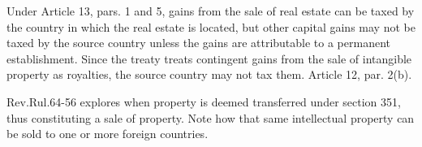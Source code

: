 Under Article 13, pars. 1 and 5, gains from the sale of real estate can be taxed by the country in which the real estate is located, but other capital gains may not be taxed by the source country unless the gains are attributable to a permanent establishment.  Since the treaty treats contingent gains from the sale of intangible property as royalties, the source country may not tax them.  Article 12, par. 2(b).      
    
Rev.\@\@ Rul.\@ 64-56 explores when property is deemed transferred under section 351, thus constituting a sale of property.  Note how that same intellectual property can be sold to one or more foreign countries.  
